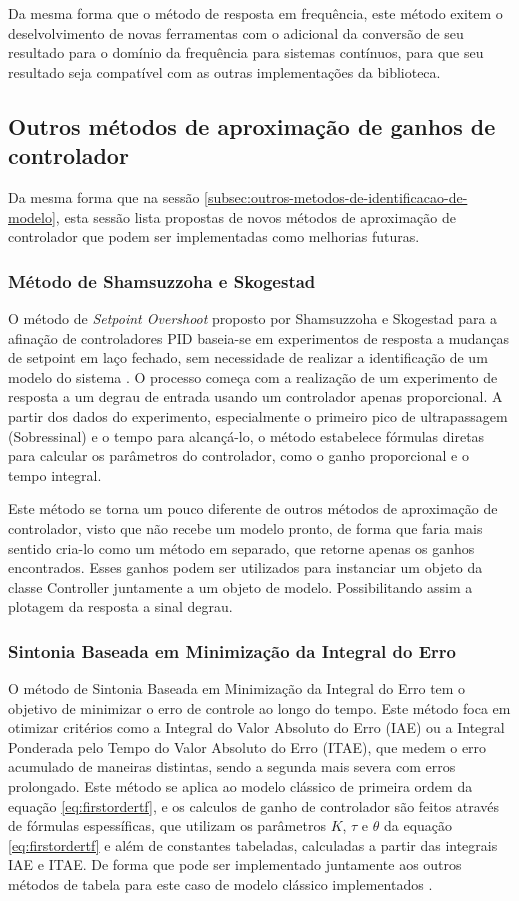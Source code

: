 Da mesma forma que o método de resposta em frequência, este método exitem o deselvolvimento de novas ferramentas
com o adicional da conversão de seu resultado para o domínio da frequência para sistemas contínuos, para que seu
resultado seja compatível com as outras implementações da biblioteca.


\subsection{Outros métodos de aproximação de ganhos de controlador}
Da mesma forma que na sessão \ref{subsec:outros-metodos-de-identificacao-de-modelo}, esta sessão lista propostas
de novos métodos de aproximação de controlador que podem ser implementadas como melhorias futuras.

\subsubsection{Método de Shamsuzzoha e Skogestad}
O método de \textit{Setpoint Overshoot} proposto por Shamsuzzoha e Skogestad para a afinação de controladores PID baseia-se em
experimentos de resposta a mudanças de setpoint em laço fechado, sem necessidade de realizar a identificação de um
modelo do sistema \cite{skoge}.
O processo começa com a realização de um experimento de resposta a um degrau de entrada usando um controlador apenas
proporcional.
A partir dos dados do experimento, especialmente o primeiro pico de ultrapassagem (Sobressinal) e o tempo para alcançá-lo,
o método estabelece fórmulas diretas para calcular os parâmetros do controlador, como o ganho proporcional e o tempo
integral.

Este método se torna um pouco diferente de outros métodos de aproximação de controlador, visto que não recebe um modelo
pronto, de forma que faria mais sentido cria-lo como um método em separado, que retorne apenas os ganhos encontrados.
Esses ganhos podem ser utilizados para instanciar um objeto da classe Controller juntamente a um objeto de modelo.
Possibilitando assim a plotagem da resposta a sinal degrau.

\subsubsection{Sintonia Baseada em Minimização da Integral do Erro}
O método de Sintonia Baseada em Minimização da Integral do Erro tem o objetivo de minimizar o erro de controle ao
longo do tempo.
Este método foca em otimizar critérios como a Integral do Valor Absoluto do Erro (IAE) ou a Integral Ponderada pelo
Tempo do Valor Absoluto do Erro (ITAE), que medem o erro acumulado de maneiras distintas, sendo a segunda mais severa
com erros prolongado.
Este método se aplica ao modelo clássico de primeira ordem da equação \eqref{eq:firstordertf}, e os calculos de ganho
de controlador são feitos através de fórmulas espessíficas, que utilizam os parâmetros $K$, $\tau$ e $\theta$ da equação
\eqref{eq:firstordertf} e além de constantes tabeladas, calculadas a partir das integrais IAE e ITAE.
De forma que pode ser implementado juntamente aos outros métodos de tabela para este caso de modelo clássico
implementados \cite{apostpidsint}.

